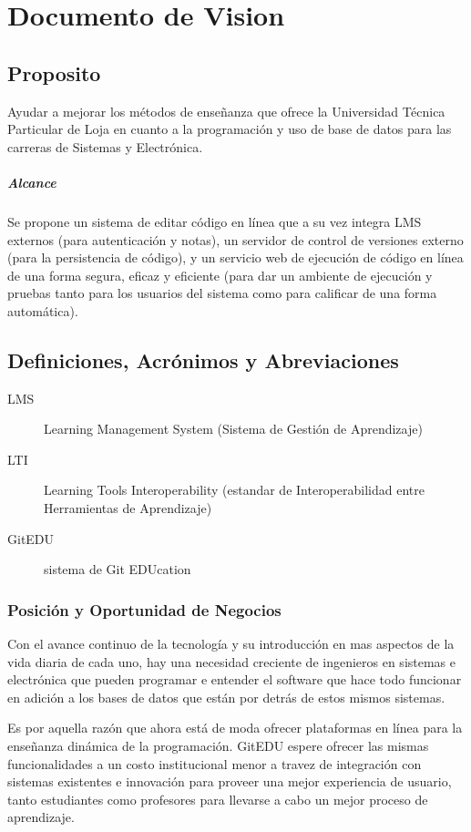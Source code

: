 

\chapter{Documento de Vision}
\label{visionDoc}


\section{Proposito}
Ayudar a mejorar los métodos de enseñanza que ofrece la Universidad Técnica Particular de Loja en cuanto a la programación y uso de base de datos para las carreras de Sistemas y Electrónica.
\paragraph{Alcance}
Se propone un sistema de editar código en línea que a su vez integra LMS externos (para autenticación y notas), un servidor de control de versiones externo (para la persistencia de código), y un servicio web de ejecución de código en línea de una forma segura, eficaz y eficiente (para dar un ambiente de ejecución y pruebas tanto para los usuarios del sistema como para calificar de una forma automática).
\section{Definiciones, Acrónimos y Abreviaciones}
\begin{description}
	\item[LMS] Learning Management System (Sistema de Gestión de Aprendizaje)
    \item[LTI] Learning Tools Interoperability (estandar de Interoperabilidad entre Herramientas de Aprendizaje)
    \item[GitEDU] sistema de Git EDUcation
\end{description}
\subsection{Posición y Oportunidad de Negocios}
Con el avance continuo de la tecnología y su introducción en mas aspectos de la vida diaria de cada uno, hay una necesidad creciente de ingenieros en sistemas e electrónica que pueden programar e entender el software que hace todo funcionar en adición a los bases de datos que están por detrás de estos mismos sistemas.
 
Es por aquella razón que ahora está de moda ofrecer plataformas en línea para la enseñanza dinámica de la programación. GitEDU espere ofrecer las mismas funcionalidades a un costo institucional menor a travez de integración con sistemas existentes e innovación para proveer una mejor experiencia de usuario, tanto estudiantes como profesores para llevarse a cabo un mejor proceso de aprendizaje.

